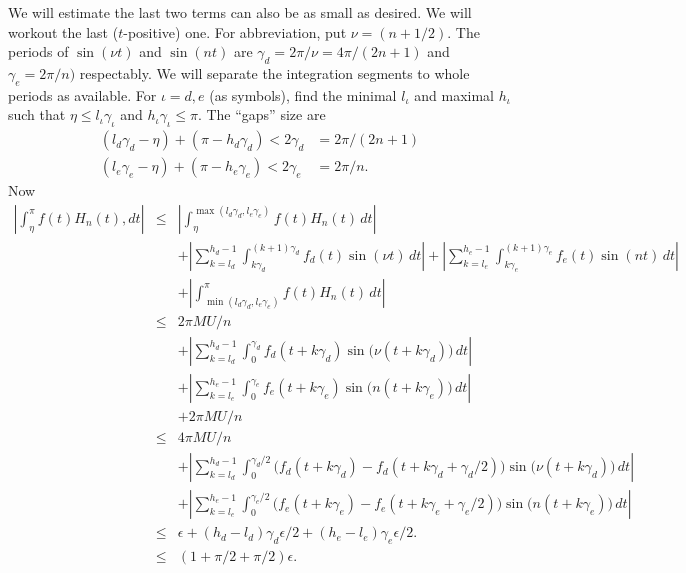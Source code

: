 \begin{enumerate}
We will estimate the last two terms can also be as small as desired.
We will workout the last ($t$-positive) one. %
For abbreviation, put \(\nu = (n+1/2)\).
The periods of 
\(\sin(\nu t)\) and \(\sin(nt)\) 
are \(\gamma_d=2\pi/\nu = 4\pi/(2n+1)\)
and \(\gamma_e=2\pi/n)\) respectably.
We will separate the integration segments to whole periods as available.
For \(\iota=d,e\) (as symbols), 
find the minimal \(l_\iota\) and maximal \(h_\iota\) such that 
\(\eta\leq l_\iota \gamma_\iota\) and \(h_\iota\gamma_\iota \leq \pi\).
The ``gaps'' size are
\begin{align*}
(l_d\gamma_d - \eta ) + (\pi - h_d\gamma_d) < 2\gamma_d &= 2\pi/(2n+1)\\
(l_e\gamma_e - \eta ) + (\pi - h_e\gamma_e) < 2\gamma_e &= 2\pi/n.
\end{align*}
Now
\begin{eqnarray*}
\left|\int_\eta^\pi f(t)H_n(t),dt\right|
&\leq&
    \left|\int_\eta^{\max(l_d\gamma_d,l_e\gamma_e)} f(t)H_n(t)\,dt\right| \\
& &  + \left|\sum_{k=l_d}^{h_d-1} \int_{k\gamma_d}^{(k+1)\gamma_d} 
           f_d(t)\sin(\nu t)\,dt\right| 
     + \left|\sum_{k=l_e}^{h_e-1} \int_{k\gamma_e}^{(k+1)\gamma_e}
           f_e(t)\sin(nt)\,dt\right| \\
& &  + \left|\int_{\min(l_d\gamma_d,l_e\gamma_e)}^\pi f(t)H_n(t)\,dt\right| \\
&\leq& 2\pi MU/n \\
& &  + \left|\sum_{k=l_d}^{h_d-1} \int_0^{\gamma_d}
           f_d(t+k\gamma_d)\sin\bigl(\nu (t+k\gamma_d)\bigr)\,dt\right| 
\\ & &
     + \left|\sum_{k=l_e}^{h_e-1} \int_0^{\gamma_e}
           f_e(t+k\gamma_e)\sin\bigl(n(t+k\gamma_e)\bigr)\,dt\right| \\
& &  + 2\pi MU/n \\
&\leq& 4\pi MU/n \\
& &  + \left|\sum_{k=l_d}^{h_d-1} \int_0^{\gamma_d/2}
           \bigl(f_d(t+k\gamma_d) - f_d(t+k\gamma_d + \gamma_d/2)\bigr)
           \sin\bigl(\nu (t+k\gamma_d)\bigr)\,dt\right| \\
& &  + \left|\sum_{k=l_e}^{h_e-1} \int_0^{\gamma_e/2}
           \bigl(f_e(t+k\gamma_e) - f_e(t+k\gamma_e + \gamma_e/2) \bigr)
           \sin\bigl(n(t+k\gamma_e)\bigr)\,dt\right| \\
&\leq& \epsilon
       + (h_d - l_d)\gamma_d\epsilon/2
       + (h_e - l_e)\gamma_e\epsilon/2. \\
&\leq& (1+\pi/2+\pi/2)\epsilon.
\end{eqnarray*}


\end{enumerate}
